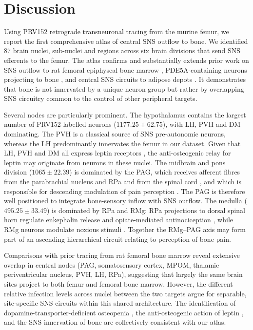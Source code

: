\documentclass[11pt]{article}
\begin{document}
\section{Discussion}

Using PRV152 retrograde transneuronal tracing from the murine femur, we report the first comprehensive atlas of central SNS outflow to bone. We identified $87$ brain nuclei, sub-nuclei and regions across six brain divisions that send SNS efferents to the femur. The atlas confirms and substantially extends prior work on SNS outflow to rat femoral epiphyseal bone marrow \cite{denes2005}, PDE5A-containing neurons projecting to bone \cite{kim2020pde5a}, and central SNS circuits to adipose depots \cite{ryu2014,ryu2015,ryu2017,bamshad1998,bamshad1999}. It demonstrates that bone is not innervated by a unique neuron group but rather by overlapping SNS circuitry common to the control of other peripheral targets.

Several nodes are particularly prominent. The hypothalamus contains the largest number of PRV152-labelled neurons ($1177.25 \pm 62.75$), with LH, PVH and DM dominating. The PVH is a classical source of SNS pre-autonomic neurons, whereas the LH predominantly innervates the femur in our dataset. Given that LH, PVH and DM all express leptin receptors \cite{flak2016leptin}, the anti-osteogenic relay for leptin \cite{ducy2000,takeda2002} may originate from neurons in these nuclei. The midbrain and pons division ($1065 \pm 22.39$) is dominated by the PAG, which receives afferent fibres from the parabrachial nucleus and RPa \cite{mantyh1982} and from the spinal cord \cite{pechura1986}, and which is responsible for descending modulation of pain perception \cite{baptista2018,benarroch2008,calvino2006}. The PAG is therefore well positioned to integrate bone-sensory inflow with SNS outflow. The medulla ($495.25 \pm 33.49$) is dominated by RPa and RMg: RPa projections to dorsal spinal horn regulate enkephalin release and opiate-mediated antinociception \cite{francois2017}, while RMg neurons modulate noxious stimuli \cite{fields1991}. Together the RMg--PAG axis may form part of an ascending hierarchical circuit relating to perception of bone pain.

Comparisons with prior tracing from rat femoral bone marrow \cite{denes2005} reveal extensive overlap in central nodes (PAG, somatosensory cortex, MPOM, thalamic periventricular nucleus, PVH, LH, RPa), suggesting that largely the same brain sites project to both femur and femoral bone marrow. However, the different relative infection levels across nuclei between the two targets argue for separable, site-specific SNS circuits within this shared architecture. The identification of dopamine-transporter-deficient osteopenia \cite{bliziotes2000}, the anti-osteogenic action of leptin \cite{takeda2002,ducy2000}, and the SNS innervation of bone \cite{francis1997,hill1991,hohmann1986,martin2007} are collectively consistent with our atlas.
\end{document}
